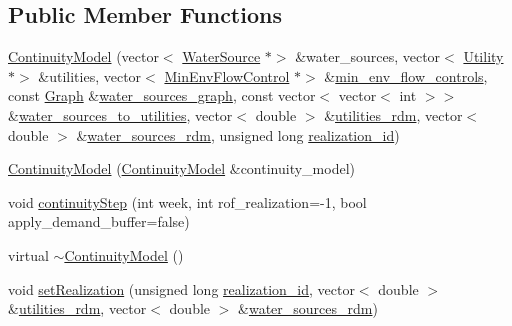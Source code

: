 \subsection*{Public Member Functions}
\begin{DoxyCompactItemize}
\item 
\mbox{\hyperlink{classContinuityModel_acadf595deb924bc08c9b702adf223365_acadf595deb924bc08c9b702adf223365}{Continuity\+Model}} (vector$<$ \mbox{\hyperlink{classWaterSource}{Water\+Source}} $\ast$$>$ \&water\+\_\+sources, vector$<$ \mbox{\hyperlink{classUtility}{Utility}} $\ast$$>$ \&utilities, vector$<$ \mbox{\hyperlink{classMinEnvFlowControl}{Min\+Env\+Flow\+Control}} $\ast$$>$ \&\mbox{\hyperlink{classContinuityModel_afc991e5c0d144020e49a97751a04b302_afc991e5c0d144020e49a97751a04b302}{min\+\_\+env\+\_\+flow\+\_\+controls}}, const \mbox{\hyperlink{classGraph}{Graph}} \&\mbox{\hyperlink{classContinuityModel_a563401588c6fa622f03393909a3522db_a563401588c6fa622f03393909a3522db}{water\+\_\+sources\+\_\+graph}}, const vector$<$ vector$<$ int $>$$>$ \&\mbox{\hyperlink{classContinuityModel_ae8516bcbbf52650190277fc8b06c1843_ae8516bcbbf52650190277fc8b06c1843}{water\+\_\+sources\+\_\+to\+\_\+utilities}}, vector$<$ double $>$ \&\mbox{\hyperlink{classContinuityModel_aa4a00b76da6295d2faa11e3dcaea1896_aa4a00b76da6295d2faa11e3dcaea1896}{utilities\+\_\+rdm}}, vector$<$ double $>$ \&\mbox{\hyperlink{classContinuityModel_ab7b8fa93a6f56b328e425e1ead6cfefa_ab7b8fa93a6f56b328e425e1ead6cfefa}{water\+\_\+sources\+\_\+rdm}}, unsigned long \mbox{\hyperlink{classContinuityModel_a7b6c99bf256f6c6b633ebb78282f43c7_a7b6c99bf256f6c6b633ebb78282f43c7}{realization\+\_\+id}})
\item 
\mbox{\hyperlink{classContinuityModel_a7f46eb1f937b813226ca7fee96e5fd5c_a7f46eb1f937b813226ca7fee96e5fd5c}{Continuity\+Model}} (\mbox{\hyperlink{classContinuityModel}{Continuity\+Model}} \&continuity\+\_\+model)
\item 
void \mbox{\hyperlink{classContinuityModel_ad880b6cb48eb24e8b78cc5425d85313b_ad880b6cb48eb24e8b78cc5425d85313b}{continuity\+Step}} (int week, int rof\+\_\+realization=-\/1, bool apply\+\_\+demand\+\_\+buffer=false)
\item 
virtual \mbox{\hyperlink{classContinuityModel_a6644d91cc76b2ccc57103aa1a2ab0c03_a6644d91cc76b2ccc57103aa1a2ab0c03}{$\sim$\+Continuity\+Model}} ()
\item 
void \mbox{\hyperlink{classContinuityModel_a47504c599955b8193ffab3bd0f328144_a47504c599955b8193ffab3bd0f328144}{set\+Realization}} (unsigned long \mbox{\hyperlink{classContinuityModel_a7b6c99bf256f6c6b633ebb78282f43c7_a7b6c99bf256f6c6b633ebb78282f43c7}{realization\+\_\+id}}, vector$<$ double $>$ \&\mbox{\hyperlink{classContinuityModel_aa4a00b76da6295d2faa11e3dcaea1896_aa4a00b76da6295d2faa11e3dcaea1896}{utilities\+\_\+rdm}}, vector$<$ double $>$ \&\mbox{\hyperlink{classContinuityModel_ab7b8fa93a6f56b328e425e1ead6cfefa_ab7b8fa93a6f56b328e425e1ead6cfefa}{water\+\_\+sources\+\_\+rdm}})

\end{DoxyCompactItemize}
